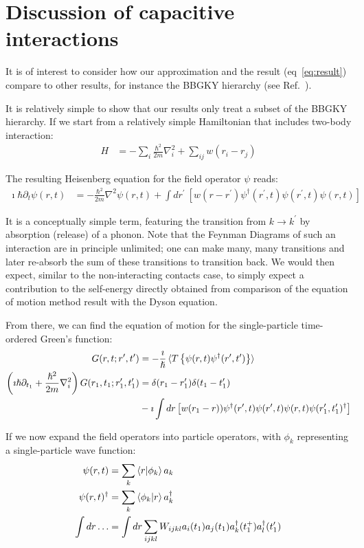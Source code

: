 \section{Discussion of capacitive interactions}
\label{sec:discussioncapacitive}
It is of interest to consider how our approximation and the result (eq~\ref{eq:result}) compare to other results, for instance the BBGKY hierarchy (see Ref.~\cite{diventra}).

It is relatively simple to show that our results only treat a subset of the BBGKY hierarchy. If we start from a relatively simple Hamiltonian that includes two-body interaction:
\begin{align*}
H &= -\sum_i \frac{\hbar^2}{2m} \nabla_i^2 + \sum_{ij} w(r_i - r_j)
\end{align*}

The resulting Heisenberg equation for the field operator $\psi$ reads:
\begin{align*}
\imath\hbar\partial_t \psi(r, t) &= -\frac{\hbar^2}{2m} \nabla^2 \psi(r,t) + \int dr^\prime \: \left[ w(r-r^\prime) \psi^\dagger (r^\prime, t) \psi(r^\prime,t) \psi(r,t)\right]
\end{align*}

It is a conceptually simple term, featuring the transition from $k\rightarrow k^\prime$ by absorption (release) of a phonon. Note that the Feynman Diagrams of such an interaction are in principle unlimited; one can make many, many transitions and later re-absorb the sum of these transitions to transition back. We would then expect, similar to the non-interacting contacts case, to simply expect a contribution to the self-energy directly obtained from comparison of the equation of motion method result with the Dyson equation.


From there, we can find the equation of motion for the single-particle time-ordered Green's function:
\begin{align*}
G(r,t;r^\prime,t^\prime) &= -\frac{\imath}{\hslash}\braket{T \left\{ \psi(r,t) \psi^\dagger(r^\prime,t^\prime)\right\}} \\
\left(\imath\hslash\partial_{t_1} + \frac{\hslash^2}{2m}\nabla_i^2\right) G(r_1, t_1; r_1^\prime, t_1^\prime) &= \delta(r_1 - r_1^\prime) \delta(t_1 - t_1^\prime) \\&- \imath \int dr\left[w(r_1 - r) ) \psi^\dagger (r^\prime, t) \psi(r^\prime,t) \psi(r,t) \psi(r_1^\prime, t_1^\prime)^\dagger\right]
\end{align*}

If we now expand the field operators into particle operators, with $\phi_k$ representing a single-particle wave function:
\begin{align*}
\psi(r, t) &= \sum_k \braket{r|\phi_k} a_k\\
\psi(r, t)^\dagger &= \sum_k \braket{\phi_k|r} a_k^\dagger \\
\int dr\ldots &= \int dr \sum_{ijkl} W_{ijkl} a_i(t_1) a_j (t_1) a_k^\dagger(t_1^+) a_l^\dagger(t_1^\prime)
\end{align*}


